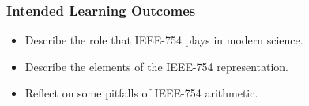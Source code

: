 \begin{frame}

\frametitle{Intended Learning Outcomes}

\begin{itemize}

\item Describe the role that IEEE-754 plays in modern science.

\item Describe the elements of the IEEE-754 representation.

\item Reflect on some pitfalls of IEEE-754 arithmetic.

\end{itemize}

\end{frame}
